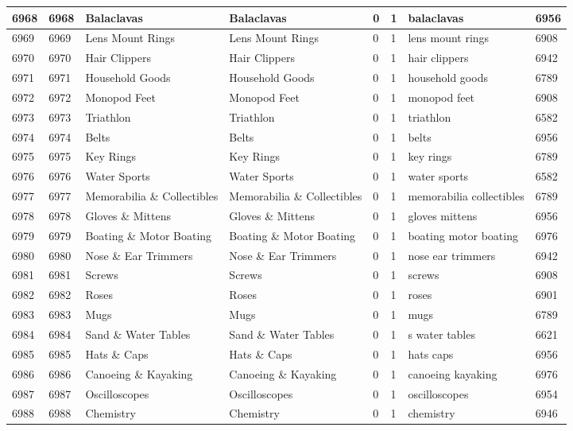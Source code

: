 \begin{longtable}{|l|l|l|l|l|l|l|l|}
6968 & 6968 & Balaclavas & Balaclavas & 0 & 1 & balaclavas & 6956 \\ \hline 
6969 & 6969 & Lens Mount Rings & Lens Mount Rings & 0 & 1 & lens mount rings & 6908 \\ \hline 
6970 & 6970 & Hair Clippers & Hair Clippers & 0 & 1 & hair clippers & 6942 \\ \hline 
6971 & 6971 & Household Goods & Household Goods & 0 & 1 & household goods & 6789 \\ \hline 
6972 & 6972 & Monopod Feet & Monopod Feet & 0 & 1 & monopod feet & 6908 \\ \hline 
6973 & 6973 & Triathlon & Triathlon & 0 & 1 & triathlon & 6582 \\ \hline 
6974 & 6974 & Belts & Belts & 0 & 1 & belts & 6956 \\ \hline 
6975 & 6975 & Key Rings & Key Rings & 0 & 1 & key rings & 6789 \\ \hline 
6976 & 6976 & Water Sports & Water Sports & 0 & 1 & water sports & 6582 \\ \hline 
6977 & 6977 & Memorabilia \& Collectibles & Memorabilia \& Collectibles & 0 & 1 & memorabilia collectibles & 6789 \\ \hline 
6978 & 6978 & Gloves \& Mittens & Gloves \& Mittens & 0 & 1 & gloves mittens & 6956 \\ \hline 
6979 & 6979 & Boating \& Motor Boating & Boating \& Motor Boating & 0 & 1 & boating motor boating & 6976 \\ \hline 
6980 & 6980 & Nose \& Ear Trimmers & Nose \& Ear Trimmers & 0 & 1 & nose ear trimmers & 6942 \\ \hline 
6981 & 6981 & Screws & Screws & 0 & 1 & screws & 6908 \\ \hline 
6982 & 6982 & Roses & Roses & 0 & 1 & roses & 6901 \\ \hline 
6983 & 6983 & Mugs & Mugs & 0 & 1 & mugs & 6789 \\ \hline 
6984 & 6984 & Sand \& Water Tables & Sand \& Water Tables & 0 & 1 & s water tables & 6621 \\ \hline 
6985 & 6985 & Hats \& Caps & Hats \& Caps & 0 & 1 & hats caps & 6956 \\ \hline 
6986 & 6986 & Canoeing \& Kayaking & Canoeing \& Kayaking & 0 & 1 & canoeing kayaking & 6976 \\ \hline 
6987 & 6987 & Oscilloscopes & Oscilloscopes & 0 & 1 & oscilloscopes & 6954 \\ \hline 
6988 & 6988 & Chemistry & Chemistry & 0 & 1 & chemistry & 6946 \\ \hline 

\end{longtable}
